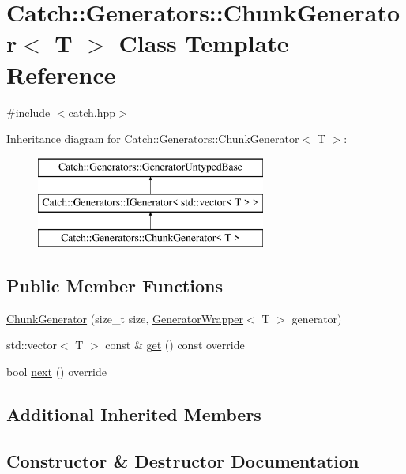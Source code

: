 \hypertarget{class_catch_1_1_generators_1_1_chunk_generator}{}\section{Catch\+:\+:Generators\+:\+:Chunk\+Generator$<$ T $>$ Class Template Reference}
\label{class_catch_1_1_generators_1_1_chunk_generator}


{\ttfamily \#include $<$catch.\+hpp$>$}

Inheritance diagram for Catch\+:\+:Generators\+:\+:Chunk\+Generator$<$ T $>$\+:\begin{figure}[H]
\begin{center}
\leavevmode
\includegraphics[height=3.000000cm]{class_catch_1_1_generators_1_1_chunk_generator}
\end{center}
\end{figure}
\subsection*{Public Member Functions}
\begin{DoxyCompactItemize}
\item 
\mbox{\hyperlink{class_catch_1_1_generators_1_1_chunk_generator_a50c334d00cde3166d71e9b90ebc2d2e3}{Chunk\+Generator}} (size\+\_\+t size, \mbox{\hyperlink{class_catch_1_1_generators_1_1_generator_wrapper}{Generator\+Wrapper}}$<$ T $>$ generator)
\item 
std\+::vector$<$ T $>$ const  \& \mbox{\hyperlink{class_catch_1_1_generators_1_1_chunk_generator_aa41c7d08a165b6a18560f2ab9e977f0b}{get}} () const override
\item 
bool \mbox{\hyperlink{class_catch_1_1_generators_1_1_chunk_generator_a545e89f80eb1e3c953491541ea083f86}{next}} () override
\end{DoxyCompactItemize}
\subsection*{Additional Inherited Members}


\subsection{Constructor \& Destructor Documentation}
\mbox{\label{class_catch_1_1_generators_1_1_chunk_generator_a50c334d00cde3166d71e9b90ebc2d2e3}} 

